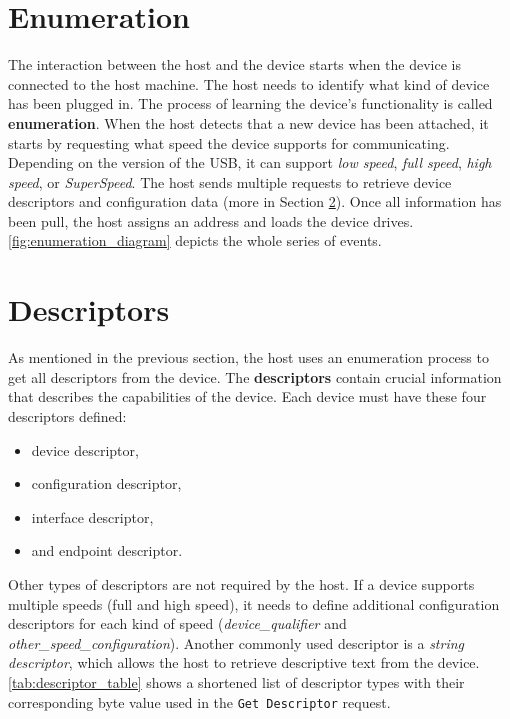 \section{Enumeration}
\label{sec:enumeration}
The interaction between the host and the device starts when the device is connected to the host machine. The host needs to identify what kind of device has been plugged in. The process of learning the device's functionality is called \textbf{enumeration}. When the host detects that a new device has been attached, it starts by requesting what speed the device supports for communicating. Depending on the version of the USB, it can support \emph{low speed}, \emph{full speed}, \emph{high speed}, or \emph{SuperSpeed}. The host sends multiple requests to retrieve device descriptors and configuration data (more in Section \ref{sec:descriptors}). Once all information has been pull, the host assigns an address and loads the device drives. \autoref{fig:enumeration_diagram} depicts the whole series of events.

\section{Descriptors}
\label{sec:descriptors}

As mentioned in the previous section, the host uses an enumeration process to get all descriptors from the device. The \textbf{descriptors} contain crucial information that describes the capabilities of the device. Each device must have these four descriptors defined:
\begin{itemize}
    \item device descriptor,
    \item configuration descriptor,
    \item interface descriptor,
    \item and endpoint descriptor.
\end{itemize}

Other types of descriptors are not required by the host. If a device supports multiple speeds (full and high speed), it needs to define additional configuration descriptors for each kind of speed (\emph{device\_qualifier} and \emph{other\_speed\_configuration}). Another commonly used descriptor is a \emph{string descriptor}, which allows the host to retrieve descriptive text from the device. \autoref{tab:descriptor_table} shows a shortened list of descriptor types with their corresponding byte value used in the \verb|Get Descriptor| request.

